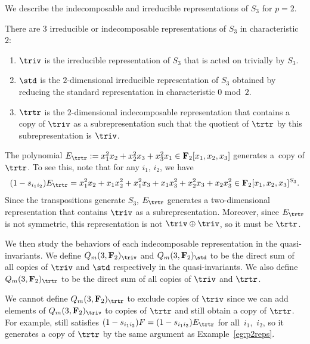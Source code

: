 We describe the indecomposable and irreducible representations of $S_3$ for $p=2$.

\begin{Proposition}\label{prop:p2indecomp}
 There are $3$ irreducible or indecomposable representations of $S_{3}$ in characteristic $2$:
 \begin{enumerate}\itemsep=0pt
 \item[$1$.] $\triv$ is the irreducible representation of $S_3$ that is acted on trivially by $S_{3}$.
 \item[$2$.] $\std$ is the $2$-dimensional irreducible representation of $S_3$ obtained by reducing the standard representation in characteristic $0$ mod~$2$.
 \item[$3$.] $\trtr$ is the $2$-dimensional indecomposable representation that contains a copy of $\triv$ as a subrepresentation such that the quotient of $\trtr$ by this subrepresentation is $\triv$.
 \end{enumerate}
\end{Proposition}

\begin{Example}\label{eg:p2reps}
 The polynomial $E_{\trtr}:=x_1^2x_2+x_2^2x_3+x_3^2x_1\in\mathbf{F}_2[x_1,x_2,x_3]$ generates a~copy of $\trtr$. To see this, note that for any $i_1$, $i_2$, we have
 \[(1-s_{i_1i_2})E_\trtr=x_1^2x_2+x_1x_2^2+x_1^2x_3+x_1x_3^2+x_2^2x_3+x_2x_3^2\in\mathbf{F}_2[x_1,x_2,x_3]^{S_3}.\]
 Since the transpositions generate $S_3$, $E_\trtr$ generates a two-dimensional representation that contains $\triv$ as a subrepresentation. Moreover, since $E_\trtr$ is not symmetric, this representation is not $\triv\oplus\triv$, so it must be $\trtr$.
\end{Example}

We then study the behaviors of each indecomposable representation in the quasi-invariants. We define $Q_m(3,\mathbf{F}_2)_{\triv}$ and $Q_m(3,\mathbf{F}_2)_{\std}$ to be the direct sum of all copies of $\triv$ and $\std$ respectively in the quasi-invariants. We also define $Q_m(3,\mathbf{F}_2)_\trtr$ to be the direct sum of all copies of $\triv$ and $\trtr$.

\begin{Remark}
 We cannot define $Q_m(3,\mathbf{F}_2)_\trtr$ to exclude copies of $\triv$ since we can add elements of $Q_m(3,\mathbf{F}_2)_\triv$ to copies of $\trtr$ and still obtain a copy of $\trtr$. For example,  still satisfies $(1-s_{i_1i_2})F=(1-s_{i_1i_2})E_\trtr$ for all~$i_1$,~$i_2$, so it generates a copy of $\trtr$ by the same argument as Example~\ref{eg:p2reps}.
\end{Remark}

